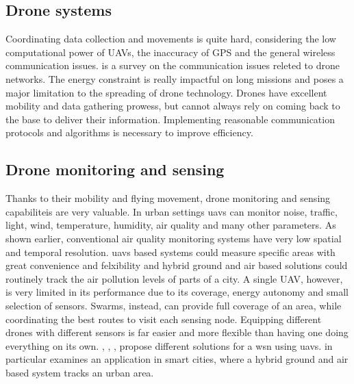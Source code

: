 \subsection{Drone systems}
Coordinating data collection and movements is quite hard, considering the low computational power of UAVs, the inaccuracy of GPS and the general wireless communication issues. \cite{s151229859} is a survey on the communication issues releted to drone networks. The energy constraint is really impactful on long missions and poses a major limitation to the spreading of drone technology. Drones have excellent mobility and data gathering prowess, but cannot always rely on coming back to the base to deliver their information. Implementing reasonable communication protocols and algorithms is necessary to improve efficiency. 
\subsection{Drone monitoring and sensing}
Thanks to their mobility and flying movement, drone monitoring and sensing capabiliteis are very valuable. In urban settings \gls{uavs} can monitor noise, traffic, light, wind, temperature, humidity, air quality and many other parameters.
As shown earlier, conventional air quality monitoring systems have very low spatial and temporal resolution. \gls{uavs} based systems could measure specific areas with great convenience and felxibility and hybrid ground and air based solutions could routinely track the air pollution levels of parts of a city. A single UAV, however, is very limited in its performance due to its coverage, energy autonomy and small selection of sensors.  Swarms, instead, can provide full coverage of an area, while coordinating the best routes to visit each sensing node. Equipping different drones with different sensors is far easier and more flexible than having one doing everything on its own.
\cite{7946542}, \cite{evangelatos2015airborne}, \cite{8675167}, \cite{8662050} propose different solutions for a \gls{wsn} using \gls{uavs}. \cite{8675167} in particular examines an application in smart cities, where a hybrid ground and air based system tracks an urban area.
